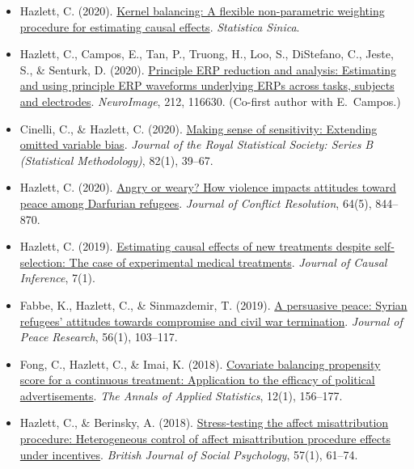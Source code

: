 \documentclass[11pt]{article}
\newcommand{\pubitem}[1]{\item #1}
\begin{document}
\begin{itemize}
\pubitem{Hazlett, C. (2020). \href{https://chadhazlett.com/publications.html#hazlett_2020_kernel_balancing}{Kernel balancing: A flexible non-parametric weighting procedure for estimating causal effects}. \textit{Statistica Sinica}.}

\pubitem{Hazlett, C., Campos, E., Tan, P., Truong, H., Loo, S., DiStefano, C., Jeste, S., \& Senturk, D. (2020). \href{https://chadhazlett.com/publications.html#hazlett_campos_2020_perp}{Principle ERP reduction and analysis: Estimating and using principle ERP waveforms underlying ERPs across tasks, subjects and electrodes}. \textit{NeuroImage}, 212, 116630. (Co-first author with E.~Campos.)}

\pubitem{Cinelli, C., \& Hazlett, C. (2020). \href{https://chadhazlett.com/publications.html#cinelli_hazlett_2020_sensitivity}{Making sense of sensitivity: Extending omitted variable bias}. \textit{Journal of the Royal Statistical Society: Series B (Statistical Methodology)}, 82(1), 39--67.}

\pubitem{Hazlett, C. (2020). \href{https://chadhazlett.com/publications.html#hazlett_2020_angry_weary}{Angry or weary? How violence impacts attitudes toward peace among Darfurian refugees}. \textit{Journal of Conflict Resolution}, 64(5), 844--870.}

\pubitem{Hazlett, C. (2019). \href{https://chadhazlett.com/publications.html#hazlett_2019_new_treatments}{Estimating causal effects of new treatments despite self-selection: The case of experimental medical treatments}. \textit{Journal of Causal Inference}, 7(1).}

\pubitem{Fabbe, K., Hazlett, C., \& Sinmazdemir, T. (2019). \href{https://chadhazlett.com/publications.html#fabbe_hazlett_sinmazdemir_2019_persuasive_peace}{A persuasive peace: Syrian refugees' attitudes towards compromise and civil war termination}. \textit{Journal of Peace Research}, 56(1), 103--117.}

\pubitem{Fong, C., Hazlett, C., \& Imai, K. (2018). \href{https://chadhazlett.com/publications.html#fong_hazlett_imai_2018_cbps_continuous}{Covariate balancing propensity score for a continuous treatment: Application to the efficacy of political advertisements}. \textit{The Annals of Applied Statistics}, 12(1), 156--177.}

\pubitem{Hazlett, C., \& Berinsky, A. (2018). \href{https://chadhazlett.com/publications.html#hazlett_berinsky_2018_amp}{Stress-testing the affect misattribution procedure: Heterogeneous control of affect misattribution procedure effects under incentives}. \textit{British Journal of Social Psychology}, 57(1), 61--74.}


\end{itemize}
\end{document}
